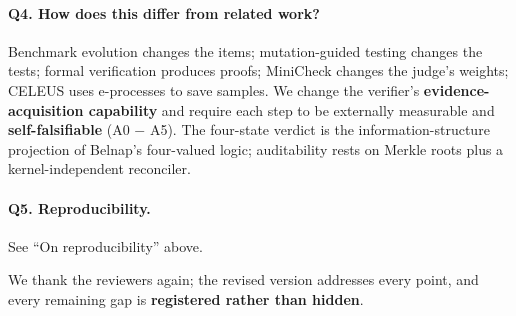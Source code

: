 \documentclass[11pt]{article}
\begin{document}
\paragraph{Q4. How does this differ from related work?}
Benchmark evolution changes the items; mutation-guided testing changes the tests; formal
verification produces proofs; MiniCheck changes the judge's weights; CELEUS uses e-processes to
save samples. We change the verifier's \textbf{evidence-acquisition capability} and require each
step to be externally measurable and \textbf{self-falsifiable} (A0 $-$ A5). The four-state verdict
is the information-structure projection of Belnap's four-valued logic; auditability rests on Merkle
roots plus a kernel-independent reconciler.

\paragraph{Q5. Reproducibility.}
See ``On reproducibility'' above.

\bigskip
\noindent
We thank the reviewers again; the revised version addresses every point, and every remaining gap is
\textbf{registered rather than hidden}.
\end{document}
